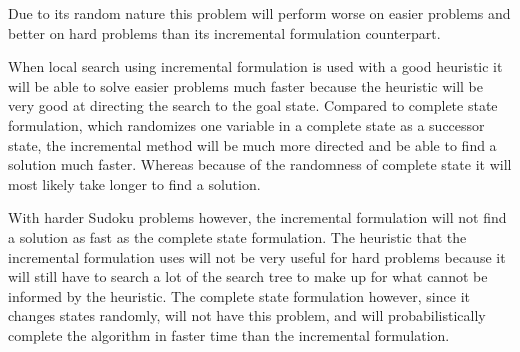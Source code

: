 \documentclass[10pt,a4paper]{article}
\begin{document}
\begin{enumerate}[A.]
		Due to its random nature this problem will perform worse on easier problems and better on hard problems than its incremental formulation counterpart.
		
		When local search using incremental formulation is used with a good heuristic it will be able to solve easier problems much faster because the heuristic will be very good at directing the search to the goal state. Compared to complete state formulation, which randomizes one variable in a complete state as a successor state, the incremental method will be much more directed and be able to find a solution much faster. Whereas because of the randomness of complete state it will most likely take longer to find a solution.
		
		With harder Sudoku problems however, the incremental formulation will not find a solution as fast as the complete state formulation. The heuristic that the incremental formulation uses will not be very useful for hard problems because it will still have to search a lot of the search tree to make up for what cannot be informed by the heuristic. The complete state formulation however, since it changes states randomly, will not have this problem, and will probabilistically complete the algorithm in faster time than the incremental formulation.
		
	\end{enumerate}
    
\end{document}
